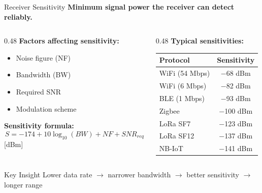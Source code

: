 \documentclass[aspectratio=169,11pt]{beamer}
\begin{document}
\begin{frame}{Receiver Sensitivity}
    \textbf{Minimum signal power the receiver can detect reliably.}
    
    \vspace{0.3cm}
    \begin{columns}[T]
        \begin{column}{0.48\textwidth}
            \textbf{Factors affecting sensitivity:}
            \begin{itemize}
                \item Noise figure (NF)
                \item Bandwidth (BW)
                \item Required SNR
                \item Modulation scheme
            \end{itemize}
            
            \vspace{0.2cm}
            \textbf{Sensitivity formula:}
            \[
            S = -174 + 10\log_{10}(BW) + NF + SNR_{req}
            \]
            \small{[dBm]}
        \end{column}
        \begin{column}{0.48\textwidth}
            \textbf{Typical sensitivities:}
            \begin{table}
                \centering
                \footnotesize
                \begin{tabular}{@{}lc@{}}
                    \toprule
                    \textbf{Protocol} & \textbf{Sensitivity} \\
                    \midrule
                    WiFi (54 Mbps) & $-$68 dBm \\
                    WiFi (6 Mbps) & $-$82 dBm \\
                    BLE (1 Mbps) & $-$93 dBm \\
                    Zigbee & $-$100 dBm \\
                    LoRa SF7 & $-$123 dBm \\
                    LoRa SF12 & $-$137 dBm \\
                    NB-IoT & $-$141 dBm \\
                    \bottomrule
                \end{tabular}
            \end{table}
        \end{column}
    \end{columns}
    
    \vspace{0.2cm}
    \begin{block}{Key Insight}
        Lower data rate $\rightarrow$ narrower bandwidth $\rightarrow$ better sensitivity $\rightarrow$ longer range
    \end{block}
\end{frame}
\end{document}
